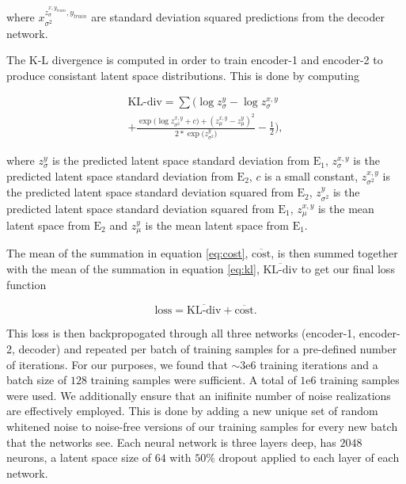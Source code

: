 \documentclass[%
showpacs,
 amsmath,amssymb,
 aps,
 twocolumn,
 prl,
 reprint,
floatfix,
]{revtex4-1}
\begin{document}
where $x^{z^{x,y_{train}}_{\sigma},y_{train}}_{\sigma^{2}}$ are standard deviation squared predictions from the 
decoder network.


%
%
The K-L divergence is computed in order to train 
encoder-1 and encoder-2 to produce consistant latent space 
distributions. This is done by computing 

\begin{equation}
    \begin{split}
    \textrm{KL-div} = \sum(\log{z^{y}_{\sigma}}-\log{z^{x,y}_{\sigma}} \\
    +\frac{\exp{(\log{z^{x,y}_{\sigma^{2}}+c)}}+(z^{x,y}_{\mu}-z^{y}_{\mu})^{2}}{2*\exp{(z^{y}_{\sigma^{2}}})}
    -\frac{1}{2}),\label{eq:kl}
    \end{split}
\end{equation}

where $z^{y}_{\sigma}$ is the predicted latent space standard deviation from $\textrm{E}_1$, 
$z^{x,y}_{\sigma}$ is the predicted latent space standard deviation from $\textrm{E}_2$, 
$c$ is a small constant, $z^{x,y}_{\sigma^{2}}$ is the predicted latent space 
standard deviation squared from $\textrm{E}_2$, $z^{y}_{\sigma^{2}}$ is the predicted 
latent space standard deviation squared from $\textrm{E}_1$, $z^{x,y}_{\mu}$ is the 
mean latent space from $\textrm{E}_2$ and $z^{y}_{\mu}$ is the mean latent space 
from $\textrm{E}_1$.

The mean of the summation in equation \ref{eq:cost}, $\overline{\textrm{cost}}$, 
is then summed together with the mean of the summation in equation \ref{eq:kl}, 
$\overline{\textrm{KL-div}}$ to 
get our final loss function

\begin{equation}
    \textrm{loss} = \overline{\textrm{KL-div}} + \overline{\textrm{cost}}.
\end{equation}

This loss is then backpropogated through all three networks 
(encoder-1, encoder-2, decoder) and repeated per batch of 
training samples for a pre-defined number of iterations. For our 
purposes, we found that $\sim3\textrm{e}6$ training iterations and 
a batch size of $128$ training samples were sufficient. A total 
of $1\textrm{e}6$ training samples were used. We additionally 
ensure that an inifinite number of noise realizations are effectively employed. This 
is done by adding a new unique set of random whitened noise to noise-free 
versions of our training samples for every new batch that the networks 
see. Each neural network is three layers deep, has $2048$ neurons, a latent 
space size of $64$ with $50\%$ dropout applied to each layer of each network.
\end{document}
